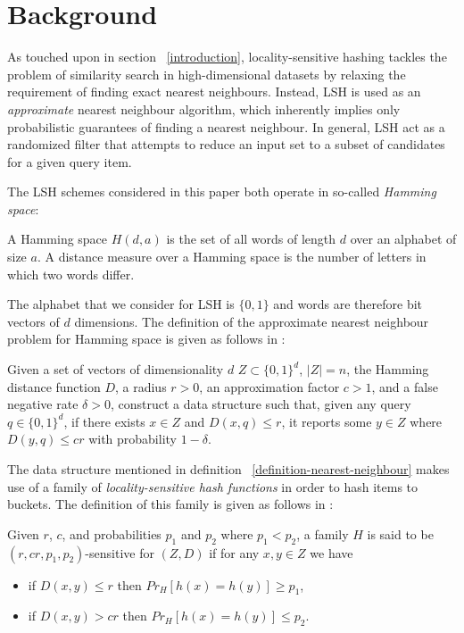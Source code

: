 \section{Background}
\label{background}

As touched upon in section ~\ref{introduction}, locality-sensitive hashing tackles the problem of similarity search in high-dimensional datasets by relaxing the requirement of finding exact nearest neighbours. Instead, LSH is used as an \textit{approximate} nearest neighbour algorithm, which inherently implies only probabilistic guarantees of finding a nearest neighbour. In general, LSH act as a randomized filter that attempts to reduce an input set to a subset of candidates for a given query item.

The LSH schemes considered in this paper both operate in so-called \textit{Hamming space}:

\begin{definition}
\label{definition-hamming-space}
  A Hamming space $H(d, a)$ is the set of all words of length $d$ over an alphabet of size $a$. A distance measure over a Hamming space is the number of letters in which two words differ.
\end{definition}

The alphabet that we consider for LSH is $\{0, 1\}$ and words are therefore bit vectors of $d$ dimensions. The definition of the approximate nearest neighbour problem for Hamming space is given as follows in \cite{DBLP:journals/corr/PhamP16}:

\begin{definition}
\label{definition-nearest-neighbour}
  Given a set of vectors of dimensionality $d$ $Z \subset \{0, 1\}^d$, $|Z| = n$, the Hamming distance function $D$, a radius $r > 0$, an approximation factor $c > 1$, and a false negative rate $\delta > 0$, construct a data structure such that, given any query $q \in \{0,1\}^d$, if there exists $x \in Z$ and $D(x, q) \leq r$, it reports some $y \in Z$ where $D(y, q) \leq cr$ with probability $1 - \delta$.
\end{definition}

The data structure mentioned in definition ~\ref{definition-nearest-neighbour} makes use of a family of \textit{locality-sensitive hash functions} in order to hash items to buckets. The definition of this family is given as follows in \cite{DBLP:conf/stoc/IndykM98}:

\begin{definition}
\label{definition-hash-functions}
  Given $r$, $c$, and probabilities $p_1$ and $p_2$ where $p_1 < p_2$, a family $H$ is said to be $(r, cr, p_1, p_2)$-sensitive for $(Z, D)$ if for any $x, y \in Z$ we have

  \begin{itemize}
    \item if $D(x, y) \leq r$ then $Pr_H [h(x) = h(y)] \geq p_1$,
    \item if $D(x, y) > cr$ then $Pr_H [h(x) = h(y)] \leq p_2$.
  \end{itemize}
\end{definition}

